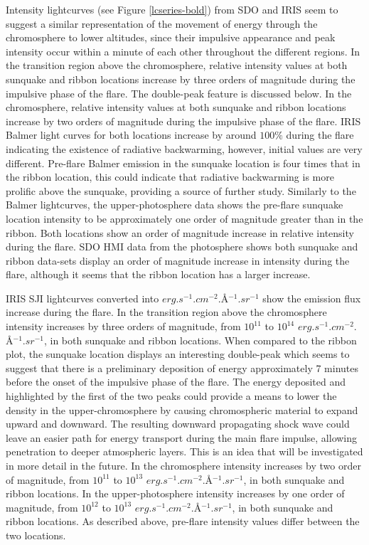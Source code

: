 Intensity lightcurves (see Figure \ref{lcseries-bold}) from SDO and IRIS seem to suggest a similar representation of the movement of energy through the chromosphere to lower altitudes, since their impulsive appearance and peak intensity occur within a minute of each other throughout the different regions. In the transition region above the chromosphere, relative intensity values at both sunquake and ribbon locations increase by three orders of magnitude during the impulsive phase of the flare. The double-peak feature is discussed below. In the chromosphere, relative intensity values at both sunquake and ribbon locations increase by two orders of magnitude during the impulsive phase of the flare. IRIS Balmer light curves for both locations increase by around $100\%$ during the flare indicating the existence of radiative backwarming, however, initial values are very different. Pre-flare Balmer emission in the sunquake location is four times that in the ribbon location, this could indicate that radiative backwarming is more prolific above the sunquake, providing a source of further study. Similarly to the Balmer lightcurves, the upper-photosphere data shows the pre-flare sunquake location intensity to be approximately one order of magnitude greater than in the ribbon. Both locations show an order of magnitude increase in relative intensity during the flare. SDO HMI data from the photosphere shows both sunquake and ribbon data-sets display an order of magnitude increase in intensity during the flare, although it seems that the ribbon location has a larger increase.      




IRIS SJI lightcurves converted into $erg.s^{-1}.cm^{-2}.$\AA$^{-1}.sr^{-1}$ show the emission flux increase during the flare. In the transition region above the chromosphere intensity increases by three orders of magnitude, from $10^{11}$ to $10^{14}$ $erg.s^{-1}.cm^{-2}.$\AA$^{-1}.sr^{-1}$, in both sunquake and ribbon locations. When compared to the ribbon plot, the sunquake location displays an interesting double-peak which seems to suggest that there is a preliminary deposition of energy approximately 7 minutes before the onset of the impulsive phase of the flare. The energy deposited and highlighted by the first of the two peaks could provide a means to lower the density in the upper-chromosphere by causing chromospheric material to expand upward and downward. The resulting downward propagating shock wave could leave an easier path for energy transport during the main flare impulse, allowing penetration to deeper atmospheric layers. This is an idea that will be investigated in more detail in the future. In the chromosphere intensity increases by two order of magnitude, from $10^{11}$ to $10^{13}$ $erg.s^{-1}.cm^{-2}.$\AA$^{-1}.sr^{-1}$, in both sunquake and ribbon locations. In the upper-photosphere intensity increases by one order of magnitude, from $10^{12}$ to $10^{13}$ $erg.s^{-1}.cm^{-2}.$\AA$^{-1}.sr^{-1}$, in both sunquake and ribbon locations. As described above, pre-flare intensity values differ between the two locations.

